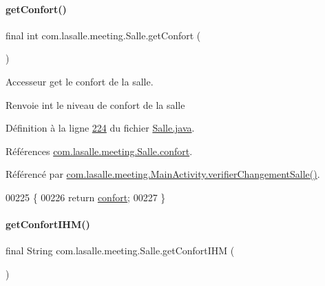 \paragraph{\texorpdfstring{get\+Confort()}{getConfort()}}
{\footnotesize\ttfamily final int com.\+lasalle.\+meeting.\+Salle.\+get\+Confort (\begin{DoxyParamCaption}{ }\end{DoxyParamCaption})}



Accesseur get le confort de la salle. 

\begin{DoxyReturn}{Renvoie}
int le niveau de confort de la salle 
\end{DoxyReturn}


Définition à la ligne \hyperlink{_salle_8java_source_l00224}{224} du fichier \hyperlink{_salle_8java_source}{Salle.\+java}.



Références \hyperlink{_salle_8java_source_l00039}{com.\+lasalle.\+meeting.\+Salle.\+confort}.



Référencé par \hyperlink{_main_activity_8java_source_l00291}{com.\+lasalle.\+meeting.\+Main\+Activity.\+verifier\+Changement\+Salle()}.


\begin{DoxyCode}
00225     \{
00226         \textcolor{keywordflow}{return} \hyperlink{classcom_1_1lasalle_1_1meeting_1_1_salle_ac165425fc78429c38042a0fed650b9ee}{confort};
00227     \}
\end{DoxyCode}
\mbox{\label{classcom_1_1lasalle_1_1meeting_1_1_salle_abf1f96423a1df46ba4d6ac4a1b6d0c34}} 
\paragraph{\texorpdfstring{get\+Confort\+I\+H\+M()}{getConfortIHM()}}
{\footnotesize\ttfamily final String com.\+lasalle.\+meeting.\+Salle.\+get\+Confort\+I\+HM (\begin{DoxyParamCaption}{ }\end{DoxyParamCaption})}



